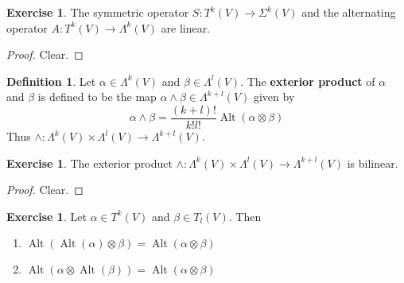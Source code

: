 \documentclass{book}
\theoremstyle{definition}
\newtheorem{defn}[definition]{Definition}
\newtheorem{ex}[definition]{Exercise}
\newcommand{\al}{\alpha}
\newcommand{\be}{\beta}
\newcommand{\Lam}{\Lambda}
\newcommand{\Sig}{\Sigma}
\DeclareMathOperator{\Alt}{Alt}
\DeclareMathOperator*{\0}{\mbf{0}}
\DeclareMathOperator*{\1}{\mbf{1}}
\begin{document}
	\begin{ex}
		The symmetric operator $S: T^k(V) \rightarrow \Sig^k(V)$ and the alternating operator $A: T^k(V) \rightarrow \Lam^k(V)$ are linear.
	\end{ex}

	\begin{proof}
		Clear.
	\end{proof}
	
	\begin{defn}
		Let $\al \in \Lam^k(V)$ and $\be \in \Lam^l(V)$. The \textbf{exterior product} of $\al$ and $\be$ is defined to be the map $\al \wedge \be \in \Lam^{k+l}(V)$ given by $$\al \wedge \be = \frac{(k+l)!}{k! l!} \Alt(\al \otimes \be)$$ 
		Thus $\wedge: \Lam^k(V) \times \Lam^l(V) \rightarrow \Lam^{k+l}(V)$.
	\end{defn}

	\begin{ex}
		The exterior product $\wedge: \Lam^k(V) \times \Lam^l(V) \rightarrow \Lam^{k+l}(V)$ is bilinear.
	\end{ex}
	
	\begin{proof}
		Clear.
	\end{proof}

	\begin{ex}
		Let $\al \in T^k(V)$ and $\be \in T_l(V)$. Then 
		\begin{enumerate}
			\item $\Alt(\Alt(\al) \otimes \be) = \Alt(\al \otimes \be)$
			\item $\Alt(\al \otimes \Alt(\be)) = \Alt(\al \otimes \be)$
		\end{enumerate}
	\end{ex}
\end{document}

